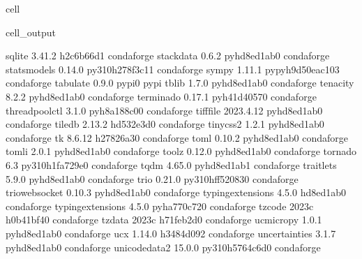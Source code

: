 \documentclass[letterpaper,table,10pt,english]{jupyterBook}
\begin{document}
\begin{sphinxuseclass}{cell}
\begin{sphinxVerbatimOutput}
\begin{sphinxuseclass}{cell_output}
\begin{sphinxVerbatim}[commandchars=\\\{\}]
sqlite                    3.41.2               h2c6b66d\PYGZus{}1    conda\PYGZhy{}forge
stack\PYGZus{}data                0.6.2              pyhd8ed1ab\PYGZus{}0    conda\PYGZhy{}forge
statsmodels               0.14.0          py310h278f3c1\PYGZus{}1    conda\PYGZhy{}forge
sympy                     1.11.1          pypyh9d50eac\PYGZus{}103    conda\PYGZhy{}forge
tabulate                  0.9.0                    pypi\PYGZus{}0    pypi
tblib                     1.7.0              pyhd8ed1ab\PYGZus{}0    conda\PYGZhy{}forge
tenacity                  8.2.2              pyhd8ed1ab\PYGZus{}0    conda\PYGZhy{}forge
terminado                 0.17.1             pyh41d4057\PYGZus{}0    conda\PYGZhy{}forge
threadpoolctl             3.1.0              pyh8a188c0\PYGZus{}0    conda\PYGZhy{}forge
tifffile                  2023.4.12          pyhd8ed1ab\PYGZus{}0    conda\PYGZhy{}forge
tiledb                    2.13.2               hd532e3d\PYGZus{}0    conda\PYGZhy{}forge
tinycss2                  1.2.1              pyhd8ed1ab\PYGZus{}0    conda\PYGZhy{}forge
tk                        8.6.12               h27826a3\PYGZus{}0    conda\PYGZhy{}forge
toml                      0.10.2             pyhd8ed1ab\PYGZus{}0    conda\PYGZhy{}forge
tomli                     2.0.1              pyhd8ed1ab\PYGZus{}0    conda\PYGZhy{}forge
toolz                     0.12.0             pyhd8ed1ab\PYGZus{}0    conda\PYGZhy{}forge
tornado                   6.3             py310h1fa729e\PYGZus{}0    conda\PYGZhy{}forge
tqdm                      4.65.0             pyhd8ed1ab\PYGZus{}1    conda\PYGZhy{}forge
traitlets                 5.9.0              pyhd8ed1ab\PYGZus{}0    conda\PYGZhy{}forge
trio                      0.21.0          py310hff52083\PYGZus{}0    conda\PYGZhy{}forge
trio\PYGZhy{}websocket            0.10.3             pyhd8ed1ab\PYGZus{}0    conda\PYGZhy{}forge
typing\PYGZhy{}extensions         4.5.0                hd8ed1ab\PYGZus{}0    conda\PYGZhy{}forge
typing\PYGZus{}extensions         4.5.0              pyha770c72\PYGZus{}0    conda\PYGZhy{}forge
tzcode                    2023c                h0b41bf4\PYGZus{}0    conda\PYGZhy{}forge
tzdata                    2023c                h71feb2d\PYGZus{}0    conda\PYGZhy{}forge
uc\PYGZhy{}micro\PYGZhy{}py               1.0.1              pyhd8ed1ab\PYGZus{}0    conda\PYGZhy{}forge
ucx                       1.14.0               h3484d09\PYGZus{}2    conda\PYGZhy{}forge
uncertainties             3.1.7              pyhd8ed1ab\PYGZus{}0    conda\PYGZhy{}forge
unicodedata2              15.0.0          py310h5764c6d\PYGZus{}0    conda\PYGZhy{}forge

\end{sphinxVerbatim}
\end{sphinxuseclass}
\end{sphinxVerbatimOutput}
\end{sphinxuseclass}
\end{document}
